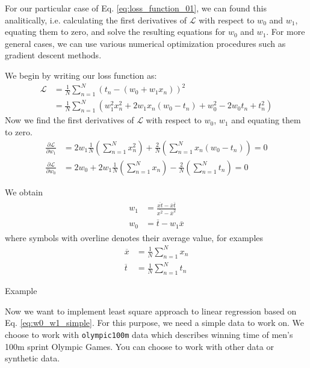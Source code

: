 \documentclass[a4paper,11pt]{article} %
\newcommand{\txtinline}[1]{\texttt{#1}}
\begin{document}
For our particular case of Eq. \eqref{eq:loss_function_01}, we can found this analitically,
i.e. calculating the first derivatives of $\mathcal{L}$ with respect to $w_0$ and $w_1$, equating
them to zero, and solve the resulting equations for $w_0$ and $w_1$.
For more general cases, we can use various numerical optimization procedures such as
gradient descent methods.

We begin by writing our loss function as:
\begin{align*}
\mathcal{L} & = \frac{1}{N} \sum_{n=1}^{N} \left( t_n - (w_0 + w_1 x_{n}) \right)^2 \\
& = \frac{1}{N} \sum_{n=1}^{N} \left( w_1^2 x_n^2 + 2w_{1}x_{n}(w_0 - t_n) + w_0^2 - 2w_0 t_n + t_n^2 \right)
\end{align*}
%
Now we find the first derivatives of $\mathcal{L}$ with respect to
$w_0$, $w_1$ and equating them to zero.
\begin{align*}
\frac{\partial\mathcal{L}}{\partial w_1} & = 2w_1 \frac{1}{N} \left( \sum_{n=1}^{N} x_n^2 \right) +
\frac{2}{N} \left( \sum_{n=1}^{N} x_{n} (w_0 - t_n) \right) = 0 \\
\frac{\partial \mathcal{L}}{\partial w_0} & = 2w_0 + 2w_1 \frac{1}{N} \left( \sum_{n=1}^{N} x_n \right) -
\frac{2}{N} \left( \sum_{n=1}^{N} t_n \right) = 0
\end{align*}

We obtain
\begin{align}
\begin{split}
w_{1} & = \frac{\overline{xt} - \overline{x}\overline{t}}{\overline{x^2} - \overline{x}^2} \\
w_{0} & = \overline{t} - w_{1} \overline{x}
\end{split}
\label{eq:w0_w1_simple}
\end{align}
where symbols with overline denotes their average value, for examples
\begin{align*}
\overline{x} & = \frac{1}{N} \sum_{n=1}^{N} x_{n} \\
\overline{t} & = \frac{1}{N} \sum_{n=1}^{N} t_{n}
\end{align*}

Example

Now we want to implement least square approach to linear regression based on
Eq. \ref{eq:w0_w1_simple}. For this purpose, we need a simple data to work on.
We choose to work with \txtinline{olympic100m} data which describes 
winning time of men's 100m sprint Olympic Games. You can choose to work with other
data or synthetic data.
\end{document}

